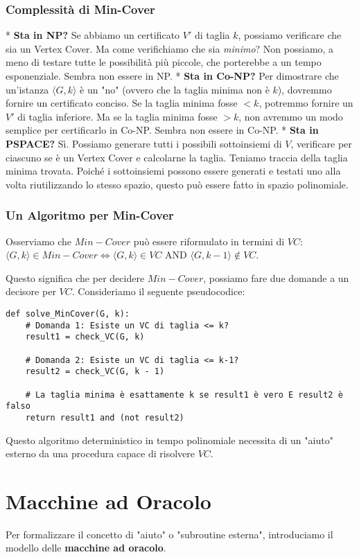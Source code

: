 \documentclass[a4paper]{article}
\theoremstyle{definition} %
\begin{document}
\subsubsection{Complessità di Min-Cover}
*   \textbf{Sta in NP?} Se abbiamo un certificato $V'$ di taglia $k$, possiamo verificare che sia un Vertex Cover. Ma come verifichiamo che sia \emph{minimo}? Non possiamo, a meno di testare tutte le possibilità più piccole, che porterebbe a un tempo esponenziale. Sembra non essere in NP.
*   \textbf{Sta in Co-NP?} Per dimostrare che un'istanza $\langle G,k \rangle$ è un "no" (ovvero che la taglia minima non è $k$), dovremmo fornire un certificato conciso. Se la taglia minima fosse $< k$, potremmo fornire un $V'$ di taglia inferiore. Ma se la taglia minima fosse $> k$, non avremmo un modo semplice per certificarlo in Co-NP. Sembra non essere in Co-NP.
*   \textbf{Sta in PSPACE?} Sì. Possiamo generare tutti i possibili sottoinsiemi di $V$, verificare per ciascuno se è un Vertex Cover e calcolarne la taglia. Teniamo traccia della taglia minima trovata. Poiché i sottoinsiemi possono essere generati e testati uno alla volta riutilizzando lo stesso spazio, questo può essere fatto in spazio polinomiale.

\subsubsection{Un Algoritmo per Min-Cover}
Osserviamo che $Min-Cover$ può essere riformulato in termini di $VC$:
$\langle G, k \rangle \in Min-Cover \iff \langle G, k \rangle \in VC \text{ AND } \langle G, k-1 \rangle \notin VC$.

Questo significa che per decidere $Min-Cover$, possiamo fare due domande a un decisore per $VC$.
Consideriamo il seguente pseudocodice:
\begin{verbatim}
def solve_MinCover(G, k):
    # Domanda 1: Esiste un VC di taglia <= k?
    result1 = check_VC(G, k)

    # Domanda 2: Esiste un VC di taglia <= k-1?
    result2 = check_VC(G, k - 1)

    # La taglia minima è esattamente k se result1 è vero E result2 è falso
    return result1 and (not result2)
\end{verbatim}
Questo algoritmo deterministico in tempo polinomiale necessita di un "aiuto" esterno da una procedura capace di risolvere $VC$.

\section{Macchine ad Oracolo}
Per formalizzare il concetto di "aiuto" o "subroutine esterna", introduciamo il modello delle \textbf{macchine ad oracolo}.
\end{document}
